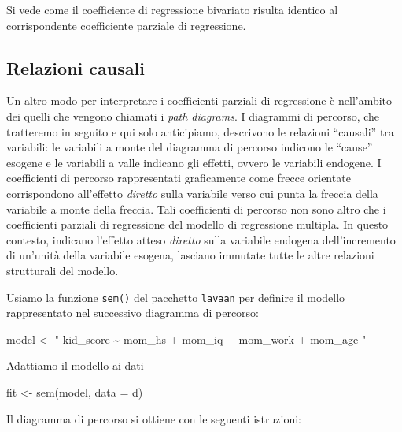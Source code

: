 \documentclass[
  11pt,
]{krantz}
\makeatletter
\newenvironment{Shaded}{\begin{snugshade}}{\end{snugshade}}
\newcommand{\AttributeTok}[1]{\textcolor[rgb]{0.61,0.61,0.61}{#1}}
\newcommand{\FunctionTok}[1]{\textcolor[rgb]{0,0,0}{#1}}
\newcommand{\NormalTok}[1]{#1}
\newcommand{\OtherTok}[1]{\textcolor[rgb]{0.37,0.37,0.37}{#1}}
\newcommand{\StringTok}[1]{\textcolor[rgb]{0.5,0.5,0.5}{#1}}
\newenvironment{kframe}{%
\medskip{}
\setlength{\fboxsep}{.8em}
 \def\at@end@of@kframe{}%
 \ifinner\ifhmode%
  \def\at@end@of@kframe{\end{minipage}}%
  \begin{minipage}{\columnwidth}%
 \fi\fi%
 \def\FrameCommand##1{\hskip\@totalleftmargin \hskip-\fboxsep
 \colorbox{shadecolor}{##1}\hskip-\fboxsep
     \hskip-\linewidth \hskip-\@totalleftmargin \hskip\columnwidth}%
 \MakeFramed {\advance\hsize-\width
   \@totalleftmargin\z@ \linewidth\hsize
   \@setminipage}}%
 {\par\unskip\endMakeFramed%
 \at@end@of@kframe}
\renewenvironment{Shaded}{\begin{kframe}}{\end{kframe}}
\makeatother
\begin{document}
Si vede come il coefficiente di regressione bivariato risulta identico al corrispondente coefficiente parziale di regressione.

\hypertarget{relazioni-causali}{%
\subsection{Relazioni causali}\label{relazioni-causali}}

Un altro modo per interpretare i coefficienti parziali di regressione è nell'ambito dei quelli che vengono chiamati i \emph{path diagrams}. I diagrammi di percorso, che tratteremo in seguito e qui solo anticipiamo, descrivono le relazioni ``causali'' tra variabili: le variabili a monte del diagramma di percorso indicono le ``cause'' esogene e le variabili a valle indicano gli effetti, ovvero le variabili endogene. I coefficienti di percorso rappresentati graficamente come frecce orientate corrispondono all'effetto \emph{diretto} sulla variabile verso cui punta la freccia della variabile a monte della freccia. Tali coefficienti di percorso non sono altro che i coefficienti parziali di regressione del modello di regressione multipla. In questo contesto, indicano l'effetto atteso \emph{diretto} sulla variabile endogena dell'incremento di un'unità della variabile esogena, lasciano immutate tutte le altre relazioni strutturali del modello.

Usiamo la funzione \texttt{sem()} del pacchetto \texttt{lavaan} per definire il modello rappresentato nel successivo diagramma di percorso:

\begin{Shaded}
\begin{Highlighting}[]
\NormalTok{model }\OtherTok{\textless{}{-}} \StringTok{"}
\StringTok{  kid\_score \textasciitilde{} mom\_hs + mom\_iq + mom\_work + mom\_age}
\StringTok{"}
\end{Highlighting}
\end{Shaded}

Adattiamo il modello ai dati

\begin{Shaded}
\begin{Highlighting}[]
\NormalTok{fit }\OtherTok{\textless{}{-}} \FunctionTok{sem}\NormalTok{(model, }\AttributeTok{data =}\NormalTok{ d)}
\end{Highlighting}
\end{Shaded}

Il diagramma di percorso si ottiene con le seguenti istruzioni:
\end{document}
